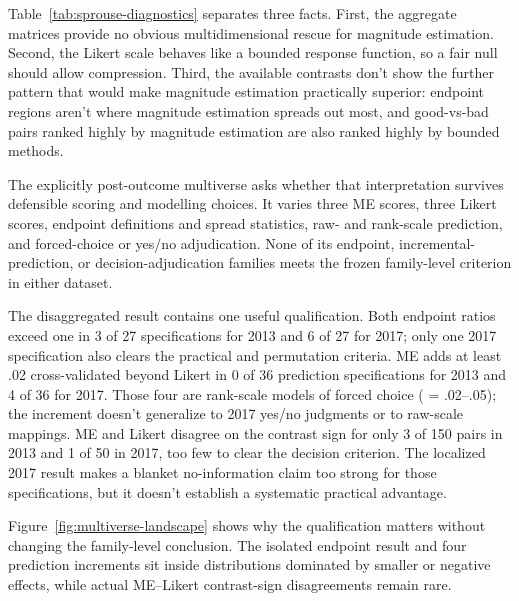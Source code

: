 Table~\ref{tab:sprouse-diagnostics} separates three facts. First, the
aggregate matrices provide no obvious multidimensional rescue for magnitude
estimation. Second, the Likert scale behaves like a bounded response function,
so a fair null should allow compression. Third, the available contrasts
don't show the further pattern that would make magnitude estimation
practically superior: endpoint regions aren't where magnitude estimation
spreads out most, and good-vs-bad pairs ranked highly by magnitude estimation
are also ranked highly by bounded methods.

The explicitly post-outcome multiverse asks whether that interpretation survives
defensible scoring and modelling choices. It varies three ME scores, three
Likert scores, endpoint definitions and spread statistics, raw- and rank-scale
prediction, and forced-choice or yes/no adjudication. None of its endpoint,
incremental-prediction, or decision-adjudication families meets the frozen
family-level criterion in either dataset.

The disaggregated result contains one useful qualification. Both endpoint ratios
exceed one in 3 of 27 specifications for 2013 and 6 of 27 for 2017; only one 2017
specification also clears the practical and permutation criteria. ME adds at
least .02 cross-validated \Rsq{} beyond Likert in 0 of 36 prediction
specifications for 2013 and 4 of 36 for 2017. Those four are rank-scale models
of forced choice (\deltaRsq{} = .02--.05); the increment doesn't generalize
to 2017 yes/no judgments or to raw-scale mappings. ME and Likert disagree on
the contrast sign for only 3 of 150 pairs in 2013 and 1 of 50 in 2017, too few
to clear the decision criterion. The localized 2017 result makes a blanket
no-information claim too strong for those specifications, but it doesn't
establish a systematic practical advantage.

Figure~\ref{fig:multiverse-landscape} shows why the qualification matters
without changing the family-level conclusion. The isolated endpoint result and
four prediction increments sit inside distributions dominated by smaller or
negative effects, while actual ME--Likert contrast-sign disagreements remain
rare.

